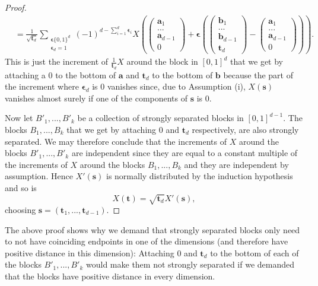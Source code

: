 \begin{proof}
\begin{align*}
        & = \frac{1}{\sqrt{\mathbf{t}_d}} \sum\limits_{\substack{{\boldsymbol{\epsilon}} \{0, 1\}^{d} \\ {\boldsymbol{\epsilon}}_d = 1}} (-1)^{d - \sum\limits_{i=1}^{d} {\boldsymbol{\epsilon}}_i}  X\left( \begin{pmatrix} \mathbf{a}_1 \\ ... \\ \mathbf{a}_{d-1} \\ 0 \end{pmatrix} + {\boldsymbol{\epsilon}} \left(\begin{pmatrix} \mathbf{b}_1 \\ ... \\ \mathbf{b}_{d-1} \\ \mathbf{t}_d \end{pmatrix}-\begin{pmatrix} \mathbf{a}_1 \\ ... \\ \mathbf{a}_{d-1} \\ 0 \end{pmatrix}\right) \right).
    \end{align*}
    This is just the increment of $\frac{1}{\mathbf{t}_{d}} X$ around the block in $[0,1]^d$ that we get by attaching a $0$ to the bottom of $\mathbf{a}$ and $\mathbf{t}_d$ to the bottom of $\mathbf{b}$ because the part of the increment where ${\boldsymbol{\epsilon}}_d$ is $0$ vanishes since, due to Assumption (i), $X(\mathbf{s})$ vanishes almost surely if one of the components of $\mathbf{s}$ is $0$.

    Now let $B'_1, ..., B'_k$ be a collection of strongly separated blocks in $[0,1]^{d-1}$. The blocks $B_1, ..., B_k$ that we get by attaching $0$ and $\mathbf{t}_d$ respectively, are also strongly separated. We may therefore conclude that the increments of $X$ around the blocks $B'_1, ..., B'_k$ are independent since they are equal to a constant multiple of the increments of $X$ around the blocks $B_1, ..., B_k$ and they are independent by assumption.
    Hence $X'(\mathbf{s})$ is normally distributed by the induction hypothesis and so is
    \[ X(\mathbf{t}) = \sqrt{\mathbf{t}_d} X'(\mathbf{s}), \]
    choosing $\mathbf{s} = (\mathbf{t}_1, ..., \mathbf{t}_{d-1})$.
\end{proof}

\begin{remark} \label{remark: on proof using strongly separated}
    The above proof shows why we demand that strongly separated blocks only need to not have coinciding endpoints in one of the dimensions (and therefore have positive distance in this dimension): Attaching $0$ and $\mathbf{t}_d$ to the bottom of each of the blocks $B'_1, ..., B'_k$ would make them not strongly separated if we demanded that the blocks have positive distance in every dimension.
\end{remark}


